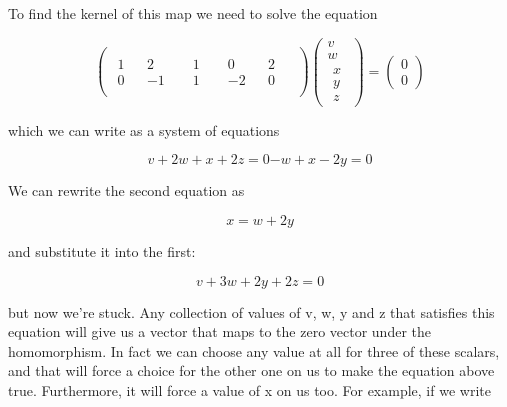 \documentclass[oneside,english]{amsbook}
\numberwithin{section}{chapter}
\theoremstyle{plain}
\theoremstyle{definition}
\begin{document}
To find the kernel of this map we need to solve the equation

\[\begin{pmatrix}
	\begin{matrix}
		1 \\
		0
	\end{matrix} & \begin{matrix}
		2 \\
		- 1
	\end{matrix} & \begin{matrix}
		\begin{matrix}
			1 \\
			1
		\end{matrix} & \begin{matrix}
			\begin{matrix}
				0 \\
				- 2
			\end{matrix} & \begin{matrix}
				2 \\
				0
			\end{matrix}
		\end{matrix}
	\end{matrix}
\end{pmatrix}\begin{pmatrix}
	v \\
	w \\
	\begin{matrix}
		x \\
		y \\
		z
	\end{matrix}
\end{pmatrix} = \begin{pmatrix}
	0 \\
	0
\end{pmatrix}\]

which we can write as a system of equations

\[{v + 2w + x + 2z = 0
}{- w + x - 2y = 0}\]

We can rewrite the second equation as

\[x = w + 2y\]

and substitute it into the first:

\[v + 3w + 2y + 2z = 0\]

but now we're stuck. Any collection of values of v, w, y and z that
satisfies this equation will give us a vector that maps to the zero
vector under the homomorphism. In fact we can choose any value at all
for three of these scalars, and that will force a choice for the other
one on us to make the equation above true. Furthermore, it will force a
value of x on us too. For example, if we write
\end{document}
